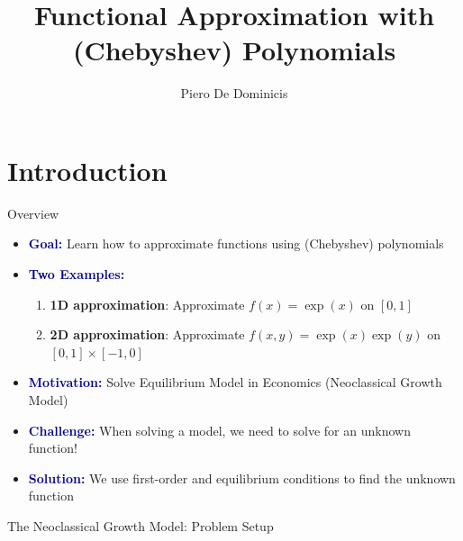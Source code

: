 \documentclass[9pt,xcolor={usenames, dvipsnames}]{beamer}
\title{\Large Functional Approximation with (Chebyshev) Polynomials}
\author[Bocconi University]{Piero De Dominicis}
\institute{Bocconi University \\ QuantEcon Reading Group}
\date{}  %
\theoremstyle{definition}
\begin{document}
\frame{\maketitle}

\section{Introduction}

\begin{frame}{Overview}

    \begin{itemize}
        \item \textbf{\textcolor{darkblue}{Goal:}} Learn how to approximate functions using (Chebyshev) polynomials
        \item \textbf{\textcolor{darkblue}{Two Examples:}}
        \begin{enumerate}
            \item \textbf{1D approximation}: Approximate $f(x) = \exp(x)$ on $[0,1]$
            \item \textbf{2D approximation}: Approximate $f(x,y) = \exp(x)\exp(y)$ on $[0,1] \times [-1,0]$
        \end{enumerate}
        \item \textbf{\textcolor{darkblue}{Motivation:}} Solve Equilibrium Model in Economics (Neoclassical Growth Model)
        \item \textbf{\textcolor{darkblue}{Challenge:}} When solving a model, we need to solve for an unknown function!
        \item \textbf{\textcolor{darkblue}{Solution:}} We use first-order and equilibrium conditions to find the unknown function 
    \end{itemize}
    
\end{frame}

\begin{frame}{The Neoclassical Growth Model: Problem Setup}



\end{frame}
\end{document}

